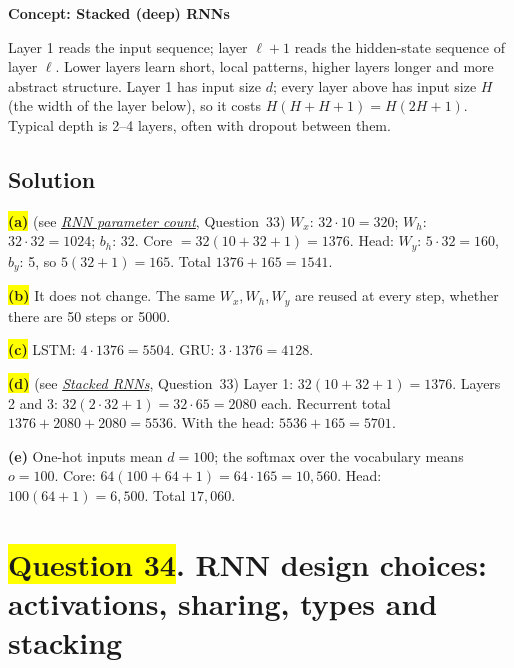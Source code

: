 \documentclass[12pt,a4paper]{article}
\newcommand{\concept}[2]{\par\medskip\phantomsection\label{#1}{\large\bfseries\color{blue!50!black} Concept: #2}\par}
\newcommand{\seeconcept}[3]{(see \hyperref[#1]{\textit{#2}}, Question~#3)}
\newcommand{\hlq}[1]{{\setlength{\fboxsep}{1.5pt}\colorbox{yellow}{#1}}}
\begin{document}
\concept{c:stacked}{Stacked (deep) RNNs}
Layer 1 reads the input sequence; layer $\ell+1$ reads the hidden-state sequence of layer $\ell$. Lower layers learn short, local patterns, higher layers longer and more abstract structure. Layer 1 has input size $d$; every layer above has input size $H$ (the width of the layer below), so it costs $H(H+H+1)=H(2H+1)$. Typical depth is 2--4 layers, often with dropout between them.

\subsection*{Solution}
\hlq{\textbf{(a)}} \seeconcept{c:rnnparams}{RNN parameter count}{33}
$W_x$: $32\cdot10=320$; $W_h$: $32\cdot32=1024$; $b_h$: 32. Core $=32(10+32+1)=1376$. Head: $W_y$: $5\cdot32=160$, $b_y$: 5, so $5(32+1)=165$. Total $1376+165=1541$.

\hlq{\textbf{(b)}} It does not change. The same $W_x,W_h,W_y$ are reused at every step, whether there are 50 steps or 5000.

\hlq{\textbf{(c)}} LSTM: $4\cdot1376=5504$. GRU: $3\cdot1376=4128$.

\hlq{\textbf{(d)}} \seeconcept{c:stacked}{Stacked RNNs}{33}
Layer 1: $32(10+32+1)=1376$. Layers 2 and 3: $32(2\cdot32+1)=32\cdot65=2080$ each. Recurrent total $1376+2080+2080=5536$. With the head: $5536+165=5701$.

\textbf{(e)} One-hot inputs mean $d=100$; the softmax over the vocabulary means $o=100$. Core: $64(100+64+1)=64\cdot165=10{,}560$. Head: $100(64+1)=6{,}500$. Total $17{,}060$.

\section[Question 34. RNN design choices: activations, sharing, types and stacking]{\hlq{Question 34}. RNN design choices: activations, sharing, types and stacking}
\end{document}
